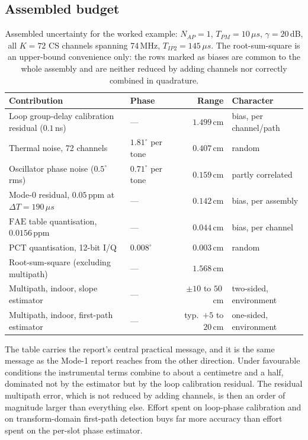 \documentclass[11pt,a4paper]{article}
\newcommand{\us}{\,\ensuremath{\upmu}s}
\newcommand{\PCT}{\mathrm{PCT}}
\newcommand{\FAE}{\mathrm{FAE}}
\newcommand{\Tpm}{T_{PM}}
\newcommand{\Tipp}{T_{IP2}}
\newcommand{\Nap}{N_{AP}}
\providecommand{\upmu}{\mu}
\begin{document}
\subsection{Assembled budget}

\begin{table}[h]
\caption{Assembled uncertainty for the worked example: $\Nap=1$, $\Tpm=10\us$, $\gamma=20$\,dB,
all $K=72$ CS channels spanning 74\,MHz, $\Tipp=145\us$. The root-sum-square is an upper-bound convenience
only: the rows marked as biases are common to the whole assembly and are neither reduced by adding
channels nor correctly combined in quadrature.}
\label{tab:example}
\centering\small
\begin{tabular}{@{}L{50mm}L{27mm}rL{26mm}@{}}
\toprule
Contribution & Phase & Range & Character \\
\midrule
Loop group-delay calibration residual ($0.1$\,ns) & --- & $1.499$\,cm & bias, per channel/path \\
Thermal noise, 72 channels & $1.81^{\circ}$ per tone & $0.407$\,cm & random \\
Oscillator phase noise ($0.5^{\circ}$ rms) & $0.71^{\circ}$ per tone & $0.159$\,cm & partly correlated \\
Mode-0 residual, $0.05$\,ppm at $\Delta T=190\us$ & --- & $0.142$\,cm & bias, per assembly \\
$\FAE$ table quantisation, $0.0156$\,ppm & --- & $0.044$\,cm & bias, per channel \\
$\PCT$ quantisation, 12-bit I/Q & $0.008^{\circ}$ & $0.003$\,cm & random \\
\midrule
Root-sum-square (excluding multipath) & --- & $1.568$\,cm & \\
\midrule
Multipath, indoor, slope estimator & --- & $\pm 10$ to $50$\,cm & two-sided, environment \\
Multipath, indoor, first-path estimator & --- & typ.\ $+5$ to $20$\,cm & one-sided, environment \\
\bottomrule
\end{tabular}
\end{table}

The table carries the report's central practical message, and it is the same message as the Mode-1
report reaches from the other direction. Under favourable conditions the instrumental terms combine
to about a centimetre and a half, dominated not by the estimator but by the loop calibration
residual. The residual multipath error, which is not reduced by adding channels, is then an order of
magnitude larger than everything else. Effort spent on loop-phase calibration and on transform-domain
first-path detection buys far more accuracy than effort spent on the per-slot phase estimator.
\end{document}
